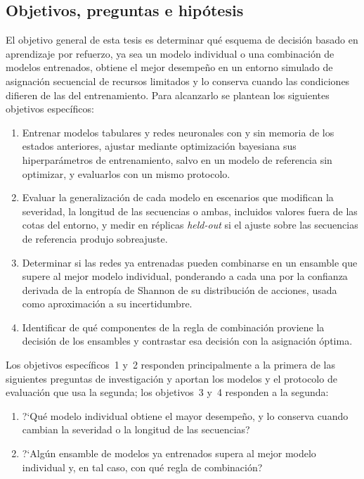 \documentclass[../00_Main/Main.tex]{subfiles}
\begin{document}
\subsection{Objetivos, preguntas e hip\'otesis}\label{sec:hypothesis}

El objetivo general de esta tesis es determinar qu\'e esquema de
decisi\'on basado en aprendizaje por refuerzo, ya sea un modelo individual
o una combinaci\'on de modelos entrenados, obtiene el mejor desempe\~no en
un entorno simulado de asignaci\'on secuencial de recursos limitados y lo
conserva cuando las condiciones difieren de las del entrenamiento. Para
alcanzarlo se plantean los siguientes objetivos espec\'ificos:

\begin{enumerate}
    \item Entrenar modelos tabulares y redes neuronales con y sin memoria
    de los estados anteriores, ajustar mediante optimizaci\'on bayesiana
    sus hiperpar\'ametros de entrenamiento, salvo en un modelo de
    referencia sin optimizar, y evaluarlos con un mismo protocolo.
    \item Evaluar la generalizaci\'on de cada modelo en escenarios que
    modifican la severidad, la longitud de las secuencias o ambas,
    incluidos valores fuera de las cotas del entorno, y medir en r\'eplicas
    \emph{held-out} si el ajuste sobre las secuencias de referencia produjo
    sobreajuste.
    \item Determinar si las redes ya entrenadas pueden combinarse en un
    ensamble que supere al mejor modelo individual, ponderando a cada una
    por la confianza derivada de la entrop\'ia de Shannon de su
    distribuci\'on de acciones, usada como aproximaci\'on a su
    incertidumbre.
    \item Identificar de qu\'e componentes de la regla de combinaci\'on
    proviene la decisi\'on de los ensambles y contrastar esa decisi\'on con
    la asignaci\'on \'optima.
\end{enumerate}

Los objetivos espec\'ificos~1 y~2 responden principalmente a la primera de
las siguientes preguntas de investigaci\'on y aportan los modelos y el
protocolo de evaluaci\'on que usa la segunda; los objetivos~3 y~4
responden a la segunda:

\begin{enumerate}
    \item ?`Qu\'e modelo individual obtiene el mayor desempe\~no, y lo
    conserva cuando cambian la severidad o la longitud de las
    secuencias?
    \item ?`Alg\'un ensamble de modelos ya entrenados supera al mejor
    modelo individual y, en tal caso, con qu\'e regla de combinaci\'on?
\end{enumerate}
\end{document}
